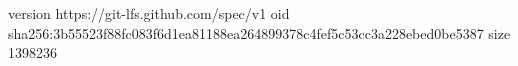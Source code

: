version https://git-lfs.github.com/spec/v1
oid sha256:3b55523f88fc083f6d1ea81188ea264899378c4fef5c53cc3a228ebed0be5387
size 1398236
